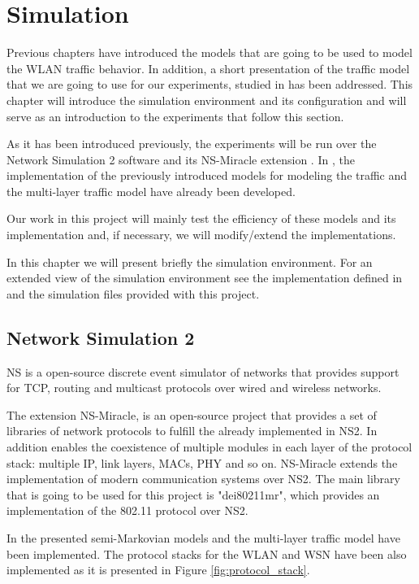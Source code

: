 \chapter{Simulation} \label{chapter:simulation}
Previous chapters have introduced the models that are going to be used to model the \acs{WLAN} traffic behavior. In addition, a short presentation of the traffic model that we are going to use for our experiments, studied in \cite{Campus-WLAN} has been addressed. This chapter will introduce the simulation environment and its configuration and will serve as an introduction to the experiments that follow this section.

As it has been introduced previously, the experiments will be run over the Network Simulation 2 software and its NS-Miracle extension \cite{NSMiracle}. In \cite{marcello-thesis}, the implementation of the previously introduced models for modeling the traffic and the multi-layer traffic model have already been developed.

Our work in this project will mainly test the efficiency of these models and its implementation and, if necessary, we will modify/extend the implementations.

In this chapter we will present briefly the simulation environment. For an extended view of the simulation environment see the implementation defined in \cite{marcello-thesis} and the simulation files provided with this project.

\section{Network Simulation 2} \label{sec:NS}
\acs{NS} is a open-source discrete event simulator of networks that provides support for \acs{TCP}, routing and multicast protocols over wired and wireless networks.

The extension NS-Miracle, is an open-source project that provides a set of libraries of network protocols to fulfill the already implemented in NS2. In addition enables the coexistence of multiple modules in each layer of the protocol stack: multiple IP, link layers, MACs, PHY and so on. NS-Miracle extends the implementation of modern communication systems over NS2. The main library that is going to be used for this project is "dei80211mr", which provides an implementation of the 802.11 protocol over NS2.

In \cite{marcello-thesis} the presented semi-Markovian models and the multi-layer traffic model \cite{Campus-WLAN} have been implemented. The protocol stacks for the \acs{WLAN} and \acs{WSN} have been also implemented as it is presented in Figure \ref{fig:protocol_stack}.

